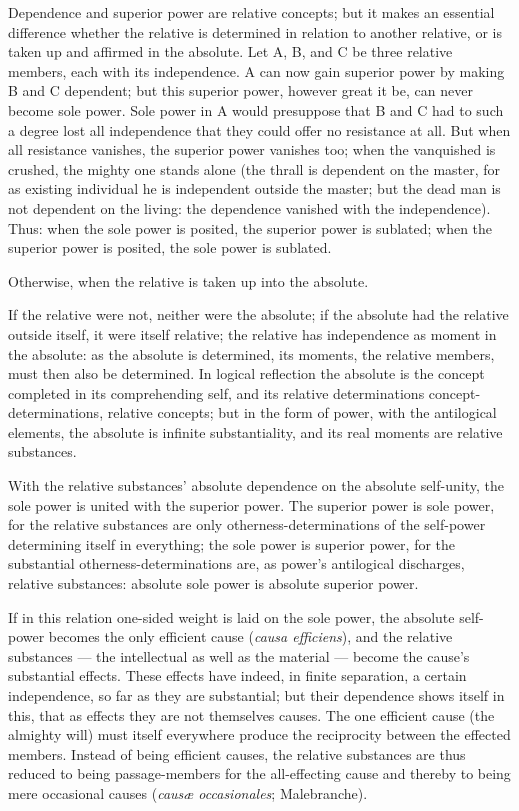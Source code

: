 \documentclass[12pt]{book}
\begin{document}
Dependence and superior power are relative concepts; but it makes an
essential difference whether the relative is determined in relation
to another relative, or is taken up and affirmed in the absolute.
Let A, B, and C be three relative members, each with its
independence. A can now gain superior power by making B and C
dependent; but this superior power, however great it be, can never
become sole power. Sole power in A would presuppose that B and C had
to such a degree lost all independence that they could offer no
resistance at all. But when all resistance vanishes, the superior
power vanishes too; when the vanquished is crushed, the mighty one
stands alone (the thrall is dependent on the master, for as existing
individual he is independent
outside the master; but the dead man is not dependent on the living:
the dependence vanished with the independence). Thus: when the sole
power is posited, the superior power is sublated; when the superior
power is posited, the sole power is sublated.

Otherwise, when the relative is taken up into the absolute.

If the relative were not, neither were the absolute; if the absolute
had the relative outside itself, it were itself relative; the
relative has independence as moment in the absolute: as the absolute
is determined, its moments, the relative members, must then also be
determined. In logical reflection the absolute is the concept
completed in its comprehending self, and its relative determinations
concept-determinations, relative concepts; but in the form of power,
with the antilogical elements, the absolute is infinite
substantiality, and its real moments are relative substances.

With the relative substances' absolute dependence on the absolute
self-unity, the sole power is united with the superior power. The
superior power is sole power, for the relative substances are only
otherness-determinations of the self-power determining itself in
everything; the sole power is superior power, for the substantial
otherness-determinations are, as power's antilogical discharges,
relative substances: absolute sole power is absolute superior power.

If in this relation one-sided weight is laid on the sole power, the
absolute self-power becomes the only efficient cause (\textit{causa
efficiens}), and the relative substances --- the intellectual as
well as the material --- become the cause's substantial effects.
These effects have indeed, in finite separation, a certain
independence, so far as they are substantial; but their dependence
shows itself in this, that as effects they are not themselves
causes. The one efficient cause (the almighty will) must itself
everywhere produce the reciprocity between the effected members.
Instead of being efficient causes, the relative substances are thus
reduced to being passage-members for the all-effecting cause and
thereby to being mere occasional causes (\textit{causæ
occasionales}; Malebranche).
\end{document}
